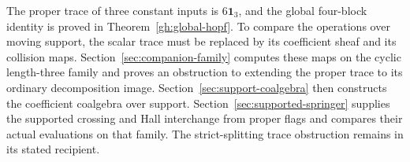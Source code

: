 The proper trace of three constant inputs is
$6\mathbf1_3$, and the global four-block identity is proved in
Theorem~\ref{gh:global-hopf}. To compare the operations over moving
support, the scalar trace must be replaced by its coefficient
sheaf and its collision maps. Section~\ref{sec:companion-family}
computes these maps on the cyclic length-three family and proves
an obstruction to extending the proper trace to its ordinary
decomposition image. Section~\ref{sec:support-coalgebra} then
constructs the coefficient coalgebra over support.
Section~\ref{sec:supported-springer} supplies the supported
crossing and Hall interchange from proper flags and compares
their actual evaluations on that family. The strict-splitting
trace obstruction remains in its stated recipient.
